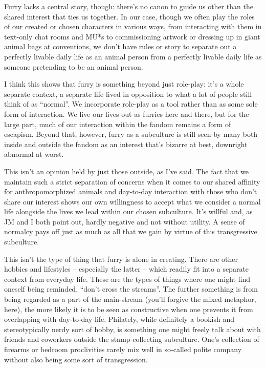 Furry lacks a central story, though: there's no canon to guide us other than the shared interest that ties us together. In our case, though we often play the roles of our created or chosen characters in various ways, from interacting with them in text-only chat rooms and MU*s to commissioning artwork or dressing up in giant animal bags at conventions, we don't have rules or story to separate out a perfectly livable daily life as an animal person from a perfectly livable daily life as someone pretending to be an animal person.

I think this shows that furry is something beyond just role-play: it's a whole separate context, a separate life lived in opposition to what a lot of people still think of as ``normal''. We incorporate role-play as a tool rather than as some sole form of interaction. We live our lives out as furries here and there, but for the large part, much of our interaction within the fandom remains a form of escapism. Beyond that, however, furry as a subculture is still seen by many both inside and outside the fandom as an interest that's bizarre at best, downright abnormal at worst.

This isn't an opinion held by just those outside, as I've said. The fact that we maintain such a strict separation of concerns when it comes to our shared affinity for anthropomorphized animals and day-to-day interaction with those who don't share our interest shows our own willingness to accept what we consider a normal life alongside the lives we lead within our chosen subculture. It's willful and, as JM and I both point out, hardly negative and not without utility. A sense of normalcy pays off just as much as all that we gain by virtue of this transgressive subculture.

This isn't the type of thing that furry is alone in creating. There are other hobbies and lifestyles -- especially the latter -- which readily fit into a separate context from everyday life. These are the types of things where one might find oneself being reminded, ``don't cross the streams''. The further something is from being regarded as a part of the main-stream (you'll forgive the mixed metaphor, here), the more likely it is to be seen as constructive when one prevents it from overlapping with day-to-day life. Philately, while definitely a bookish and stereotypically nerdy sort of hobby, is something one might freely talk about with friends and coworkers outside the stamp-collecting subculture. One's collection of firearms or bedroom proclivities rarely mix well in so-called polite company without also being some sort of transgression.

